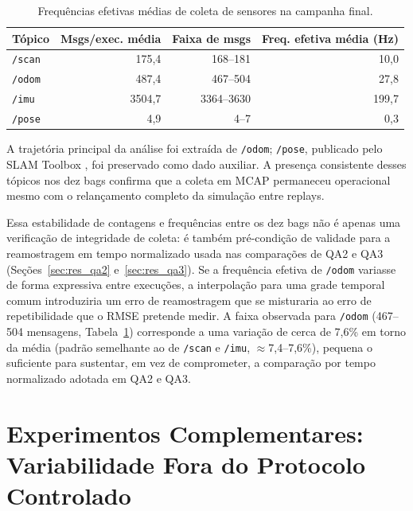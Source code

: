 \begin{table}[H]
\centering
\caption{Frequências efetivas médias de coleta de sensores na campanha final.}
\label{tab:sensor_bags}
\begin{tabular}{lrrr}
\toprule
\textbf{Tópico} & \textbf{Msgs/exec. média} & \textbf{Faixa de msgs} & \textbf{Freq. efetiva média (Hz)} \\
\midrule
\texttt{/\allowbreak scan} & 175,4 & 168--181 & 10,0 \\
\texttt{/\allowbreak odom} & 487,4 & 467--504 & 27,8 \\
\texttt{/\allowbreak imu}  & 3504,7 & 3364--3630 & 199,7 \\
\texttt{/\allowbreak pose} & 4,9 & 4--7 & 0,3 \\
\bottomrule
\end{tabular}
\end{table}

A trajetória principal da análise foi extraída de \texttt{/\allowbreak odom};
\texttt{/\allowbreak pose}, publicado pelo SLAM Toolbox \cite{macenski2021slam},
foi preservado como dado auxiliar. A presença
consistente desses tópicos nos dez bags confirma que a coleta em MCAP permaneceu
operacional mesmo com o relançamento completo da simulação entre replays.

Essa estabilidade de contagens e frequências entre os dez bags não é apenas uma
verificação de integridade de coleta: é também pré-condição de validade para a
reamostragem em tempo normalizado usada nas comparações de QA2 e QA3
(Seções~\ref{sec:res_qa2} e~\ref{sec:res_qa3}). Se a frequência efetiva de
\texttt{/\allowbreak odom} variasse de forma expressiva entre execuções, a
interpolação para uma grade temporal comum introduziria um erro de reamostragem
que se misturaria ao erro de repetibilidade que o RMSE pretende medir. A faixa
observada para \texttt{/\allowbreak odom} (467--504 mensagens, Tabela~\ref{tab:sensor_bags})
corresponde a uma variação de cerca de 7,6\% em torno da média (padrão
semelhante ao de \texttt{/\allowbreak scan} e \texttt{/\allowbreak imu},
$\approx$7,4--7,6\%), pequena o suficiente para sustentar, em vez de
comprometer, a comparação por tempo normalizado adotada em QA2 e QA3.

\section{Experimentos Complementares: Variabilidade Fora do Protocolo Controlado}
\label{sec:res_exp_complementares}

